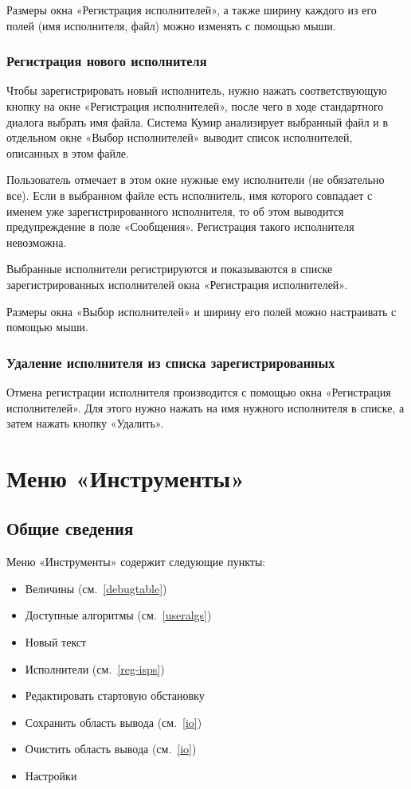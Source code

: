Размеры окна «Регистрация исполнителей», а также ширину каждого из его полей (имя исполнителя, файл) можно изменять с помощью мыши.

\subsubsection{Регистрация нового исполнителя}

Чтобы зарегистрировать новый исполнитель, нужно нажать соответствующую кнопку на окне «Регистрация исполнителей», после чего в ходе стандартного диалога выбрать имя файла. Система Кумир анализирует выбранный файл и в отдельном окне «Выбор исполнителей» выводит список исполнителей, описанных в этом файле.

Пользователь отмечает в этом окне нужные ему исполнители (не обязательно все). Если в выбранном файле есть исполнитель, имя которого совпадает с именем уже зарегистрированного исполнителя, то об этом выводится предупреждение в поле «Сообщения». Регистрация такого исполнителя невозможна.

Выбранные исполнители регистрируются и показываются в списке зарегистрированных исполнителей окна «Регистрация исполнителей».

Размеры окна «Выбор исполнителей» и ширину его полей можно настраивать с помощью мыши. 

\subsubsection{Удаление исполнителя из списка зарегистрированных}

Отмена регистрации исполнителя производится с помощью окна «Регистрация исполнителей». Для этого нужно нажать на имя нужного исполнителя в списке, а затем нажать кнопку «Удалить».

\section{Меню «Инструменты»}
\label{tools}

\subsection{Общие сведения}

Меню «Инструменты» содержит следующие пункты:
\begin{itemize}
\item	Величины (см.~\ref{debugtable})
\item	Доступные алгоритмы (см.~\ref{useralgs})
\item	Новый текст
\item	Исполнители (см.~\ref{reg-isps})
\item	Редактировать стартовую обстановку
\item	Сохранить область вывода (см.~\ref{io})
\item	Очистить область вывода (см.~\ref{io})
\item	Настройки
\end{itemize}

